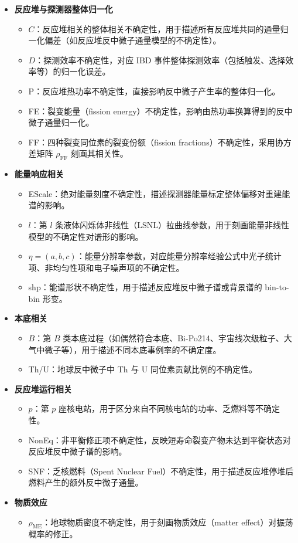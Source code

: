 \begin{itemize}
  \item \textbf{反应堆与探测器整体归一化}
    \begin{itemize}
      \item $C$：反应堆相关的整体相关不确定性，用于描述所有反应堆共同的通量归一化偏差（如反应堆反中微子通量模型的不确定性）。
      \item $D$：探测效率不确定性，对应 IBD 事件整体探测效率（包括触发、选择效率等）的归一化误差。
      \item P：反应堆热功率不确定性，直接影响反中微子产生率的整体归一化。
      \item FE：裂变能量（fission energy）不确定性，影响由热功率换算得到的反中微子通量归一化。
      \item FF：四种裂变同位素的裂变份额（fission fractions）不确定性，采用协方差矩阵 $\rho_{\mathrm{FF}}$ 刻画其相关性。
    \end{itemize}
  \item \textbf{能量响应相关}
    \begin{itemize}
      \item EScale：绝对能量刻度不确定性，描述探测器能量标定整体偏移对重建能谱的影响。
      \item $l$：第 $l$ 条液体闪烁体非线性（LSNL）拉曲线参数，用于刻画能量非线性模型的不确定性对谱形的影响。
      \item $\eta=(a,b,c)$：能量分辨率参数，对应能量分辨率经验公式中光子统计项、非均匀性项和电子噪声项的不确定性。
      \item shp：能谱形状不确定性，用于描述反应堆反中微子谱或背景谱的 bin-to-bin 形变。
    \end{itemize}
  \item \textbf{本底相关}
    \begin{itemize}
      \item $B$：第 $B$ 类本底过程（如偶然符合本底、Bi-Po214、宇宙线次级粒子、大气中微子等），用于描述不同本底事例率的不确定度。
      \item Th/U：地球反中微子中 Th 与 U 同位素贡献比例的不确定性。
    \end{itemize}
  \item \textbf{反应堆运行相关}
    \begin{itemize}
      \item $p$：第 $p$ 座核电站，用于区分来自不同核电站的功率、乏燃料等不确定性。
      \item NonEq：非平衡修正项不确定性，反映短寿命裂变产物未达到平衡状态对反应堆反中微子谱的影响。
      \item SNF：乏核燃料（Spent Nuclear Fuel）不确定性，用于描述反应堆停堆后燃料产生的额外反中微子通量。
    \end{itemize}
  \item \textbf{物质效应}
    \begin{itemize}
      \item $\rho_{\mathrm{ME}}$：地球物质密度不确定性，用于刻画物质效应（matter effect）对振荡概率的修正。
    \end{itemize}
\end{itemize}
